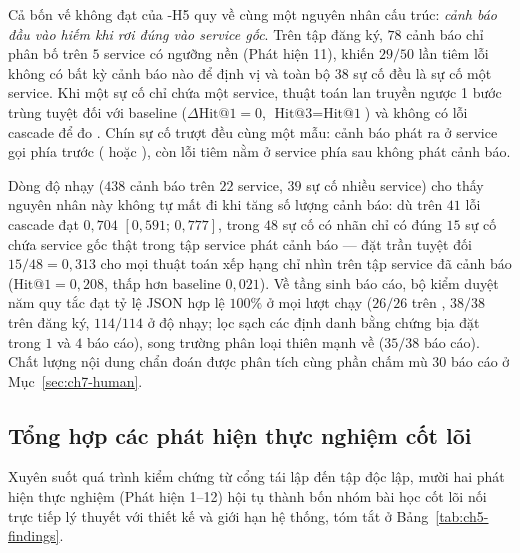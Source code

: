 Cả bốn vế không đạt của \hyp{H5} quy về cùng một nguyên nhân cấu trúc: \emph{cảnh báo đầu vào hiếm khi rơi đúng vào service gốc}. Trên tập đăng ký, $78$ cảnh báo chỉ phân bố trên $5$ service có ngưỡng nền  (Phát hiện 11), khiến $29/50$ lần tiêm lỗi không có bất kỳ cảnh báo nào để định vị và toàn bộ $38$ sự cố đều là sự cố một service. Khi một sự cố chỉ chứa một service, thuật toán lan truyền ngược 1 bước trùng tuyệt đối với baseline ($\Delta\text{Hit@1} = 0$, $\text{Hit@3} = \text{Hit@1}$) và không có lỗi cascade để đo . Chín sự cố trượt đều cùng một mẫu: cảnh báo phát ra ở service gọi phía trước ( hoặc ), còn lỗi tiêm nằm ở service phía sau không phát cảnh báo.

Dòng độ nhạy ($438$ cảnh báo trên $22$ service, $39$ sự cố nhiều service) cho thấy nguyên nhân này không tự mất đi khi tăng số lượng cảnh báo: dù  trên $41$ lỗi cascade đạt $0{,}704$ $[0{,}591;\, 0{,}777]$, trong $48$ sự cố có nhãn chỉ có đúng $15$ sự cố chứa service gốc thật trong tập service phát cảnh báo — đặt trần tuyệt đối $15/48 = 0{,}313$ cho mọi thuật toán xếp hạng chỉ nhìn trên tập service đã cảnh báo ($\text{Hit@1} = 0{,}208$, thấp hơn baseline $0{,}021$). Về tầng sinh báo cáo, bộ kiểm duyệt năm quy tắc đạt tỷ lệ JSON hợp lệ $100\%$ ở mọi lượt chạy ($26/26$ trên , $38/38$ trên  đăng ký, $114/114$ ở độ nhạy; lọc sạch các định danh bằng chứng bịa đặt trong $1$ và $4$ báo cáo), song trường phân loại  thiên mạnh về  ($35/38$ báo cáo). Chất lượng nội dung chẩn đoán được phân tích cùng phần chấm mù $30$ báo cáo ở Mục~\ref{sec:ch7-human}.

\subsection{Tổng hợp các phát hiện thực nghiệm cốt lõi}
\label{sec:ch5-synthesis}

Xuyên suốt quá trình kiểm chứng từ cổng tái lập đến tập  độc lập, mười hai phát hiện thực nghiệm (Phát hiện 1--12) hội tụ thành bốn nhóm bài học cốt lõi nối trực tiếp lý thuyết với thiết kế và giới hạn hệ thống, tóm tắt ở Bảng~\ref{tab:ch5-findings}.


